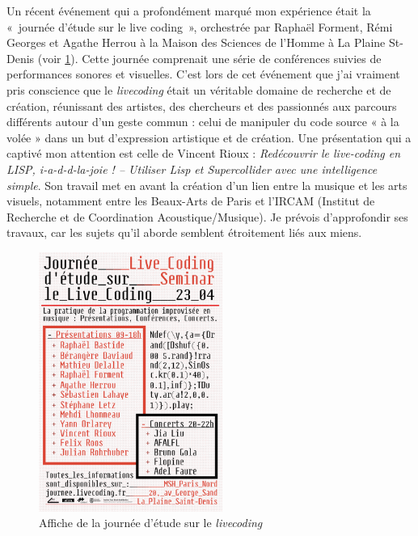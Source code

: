 Un récent événement qui a profondément marqué mon expérience était la «~journée d'étude sur le live coding~», orchestrée par Raphaël Forment, Rémi Georges et Agathe Herrou à la Maison des Sciences de l'Homme à La Plaine St-Denis (voir \ref{jlc00}). Cette journée comprenait une série de conférences suivies de performances sonores et visuelles. C'est lors de cet événement que j'ai vraiment pris conscience que le \textit{livecoding} était un véritable domaine de recherche et de création, réunissant des artistes, des chercheurs et des passionnés aux parcours différents autour d’un geste commun : celui de manipuler du code source « à la volée » dans un but d'expression artistique et de création. Une présentation qui a captivé mon attention est celle de Vincent Rioux : \textit{Redécouvrir le live-coding en LISP, i-a-d-d-la-joie ! – Utiliser Lisp et Supercollider avec une intelligence simple}. Son travail met en avant la création d'un lien entre la musique et les arts visuels, notamment entre les Beaux-Arts de Paris et l'IRCAM (Institut de Recherche et de Coordination Acoustique/Musique). Je prévois d'approfondir ses travaux, car les sujets qu'il aborde semblent étroitement liés aux miens.

\begin{figure}[h]
    \centering
    \includegraphics[width=6cm]{images/jlc_affiche.png}
    \caption{Affiche de la journée d’étude sur le \textit{livecoding}}
    \label{jlc00}
\end{figure}



